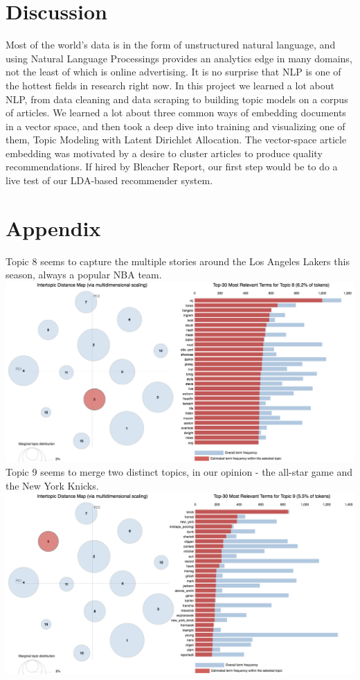 \documentclass[11pt]{article}
\begin{document}
\section{Discussion}
Most of the world's data is in the form of unstructured natural language, and using Natural Language Processings provides an analytics edge in many domains, not the least of which is online advertising.  It is no surprise that NLP is one of the hottest fields in research right now.  In this project we learned a lot about NLP, from data cleaning and data scraping to building topic models on a corpus of articles.  We learned a lot about three common ways of embedding documents in a vector space, and then took a deep dive into training and visualizing one of them, Topic Modeling with Latent Dirichlet Allocation. The vector-space article embedding was motivated by a desire to cluster articles to produce quality recommendations.  If hired by Bleacher Report, our first step would be to do a live test of our LDA-based recommender system.  \\


\section{Appendix}
Topic 8 seems to capture the multiple stories around the Los Angeles Lakers this season, always a popular NBA team. \\
\includegraphics[width=470pt]{8.png} \\

Topic 9 seems to merge two distinct topics, in our opinion - the all-star game and the New York Knicks. \\
\includegraphics[width=470pt]{9.png} \\
\end{document}
